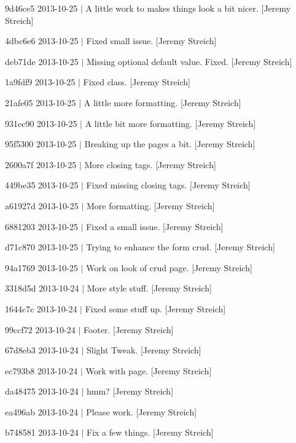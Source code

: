 \begin{DoxyItemize}
\item 9d46ce5 2013-\/10-\/25 $|$ A little work to makes things look a bit nicer. \mbox{[}Jeremy Streich\mbox{]}
\item 4dbc6e6 2013-\/10-\/25 $|$ Fixed small issue. \mbox{[}Jeremy Streich\mbox{]}
\item deb71de 2013-\/10-\/25 $|$ Missing optional default value. Fixed. \mbox{[}Jeremy Streich\mbox{]}
\item 1a9fdf9 2013-\/10-\/25 $|$ Fixed class. \mbox{[}Jeremy Streich\mbox{]}
\item 21afe05 2013-\/10-\/25 $|$ A little more formatting. \mbox{[}Jeremy Streich\mbox{]}
\item 931ec90 2013-\/10-\/25 $|$ A little bit more formatting. \mbox{[}Jeremy Streich\mbox{]}
\item 95f5300 2013-\/10-\/25 $|$ Breaking up the pages a bit. \mbox{[}Jeremy Streich\mbox{]}
\item 2600a7f 2013-\/10-\/25 $|$ More closing tags. \mbox{[}Jeremy Streich\mbox{]}
\item 449be35 2013-\/10-\/25 $|$ Fixed missing closing tags. \mbox{[}Jeremy Streich\mbox{]}
\item a61927d 2013-\/10-\/25 $|$ More formatting. \mbox{[}Jeremy Streich\mbox{]}
\item 6881203 2013-\/10-\/25 $|$ Fixed a small issue. \mbox{[}Jeremy Streich\mbox{]}
\item d71c870 2013-\/10-\/25 $|$ Trying to enhance the form crud. \mbox{[}Jeremy Streich\mbox{]}
\item 94a1769 2013-\/10-\/25 $|$ Work on look of crud page. \mbox{[}Jeremy Streich\mbox{]}
\item 3318d5d 2013-\/10-\/24 $|$ More style stuff. \mbox{[}Jeremy Streich\mbox{]}
\item 1644c7c 2013-\/10-\/24 $|$ Fixed some stuff up. \mbox{[}Jeremy Streich\mbox{]}
\item 99ccf72 2013-\/10-\/24 $|$ Footer. \mbox{[}Jeremy Streich\mbox{]}
\item 67d8eb3 2013-\/10-\/24 $|$ Slight Tweak. \mbox{[}Jeremy Streich\mbox{]}
\item ec793b8 2013-\/10-\/24 $|$ Work with page. \mbox{[}Jeremy Streich\mbox{]}
\item da48475 2013-\/10-\/24 $|$ hmm? \mbox{[}Jeremy Streich\mbox{]}
\item ea496ab 2013-\/10-\/24 $|$ Please work. \mbox{[}Jeremy Streich\mbox{]}
\item b748581 2013-\/10-\/24 $|$ Fix a few things. \mbox{[}Jeremy Streich\mbox{]}

\end{DoxyItemize}
